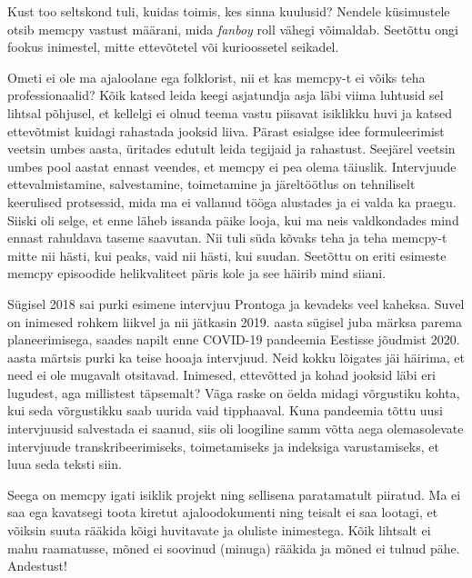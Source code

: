 Kust too seltskond tuli, kuidas toimis, kes sinna kuulusid? Nendele küsimustele 
otsib memcpy vastust määrani, mida \emph{fanboy} roll vähegi võimaldab. Seetõttu ongi 
fookus inimestel, mitte ettevõtetel 
või kurioossetel seikadel. 

Ometi ei ole ma ajaloolane ega folklorist, nii et kas memcpy-t ei võiks teha 
professionaalid? Kõik katsed leida keegi asjatundja asja läbi viima luhtusid 
sel lihtsal põhjusel, et kellelgi ei olnud teema vastu piisavat isiklikku huvi 
ja katsed ettevõtmist kuidagi rahastada jooksid liiva. Pärast esialgse 
idee formuleerimist veetsin umbes aasta, üritades edutult leida tegijaid ja 
rahastust. Seejärel veetsin umbes pool aastat ennast veendes, et memcpy ei pea 
olema täiuslik. Intervjuude ettevalmistamine, salvestamine, toimetamine ja 
järeltöötlus on tehniliselt keerulised protsessid, mida ma ei vallanud tööga alustades ja 
ei valda ka praegu. Siiski oli selge, et enne läheb issanda päike looja, kui ma 
neis valdkondades mind ennast rahuldava taseme saavutan. Nii tuli süda kõvaks teha ja teha memcpy-t 
mitte nii hästi, kui peaks, vaid nii hästi, kui suudan. Seetõttu on 
eriti esimeste memcpy episoodide helikvaliteet päris kole ja see häirib mind 
siiani.

Sügisel 2018 sai purki esimene intervjuu Prontoga ja 
kevadeks veel kaheksa. Suvel on inimesed rohkem liikvel ja nii jätkasin 
2019. aasta sügisel juba märksa parema planeerimisega, saades napilt enne COVID-19 
pandeemia Eestisse jõudmist 2020. aasta märtsis purki ka teise hooaja 
intervjuud. Neid kokku lõigates jäi häirima, et need ei ole mugavalt 
otsitavad. Inimesed, ettevõtted ja kohad jooksid läbi eri lugudest, aga 
millistest täpsemalt? Väga raske on öelda midagi võrgustiku kohta, kui seda võrgustikku 
saab uurida vaid tipphaaval. Kuna pandeemia tõttu uusi intervjuusid salvestada ei 
saanud, siis oli loogiline samm võtta aega olemasolevate intervjuude
transkribeerimiseks, toimetamiseks ja indeksiga varustamiseks, et luua
seda teksti siin. 

Seega on memcpy igati isiklik projekt ning sellisena paratamatult 
piiratud. Ma ei saa ega kavatsegi toota kiretut ajaloodokumenti ning teisalt ei saa lootagi, et võiksin suuta rääkida kõigi 
huvitavate ja oluliste inimestega. Kõik lihtsalt ei mahu raamatusse, mõned ei 
soovinud (minuga) rääkida ja mõned ei tulnud pähe. Andestust! 

